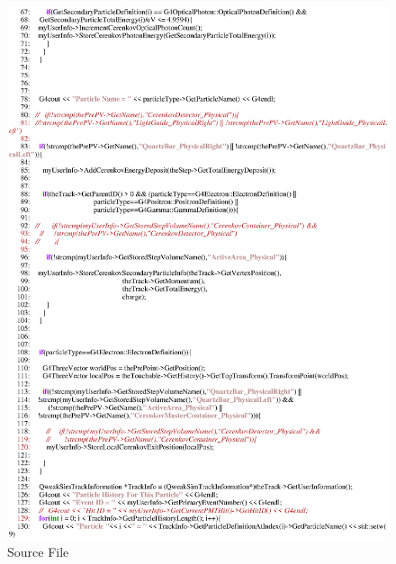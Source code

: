 \begin{figure}[h]
  \hspace{0cm}
  \includegraphics[scale=0.8]{./figures16/QweakSimSteppingAction.cc-p2.eps}
  \caption{\label{SourceXVI3}Source File}
           \label{fig:XVI-SC-3}
\end{figure}
\clearpage


